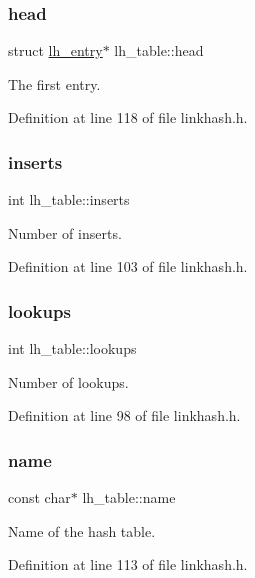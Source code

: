 \subsubsection{\texorpdfstring{head}{head}}
{\footnotesize\ttfamily struct \hyperlink{structlh__entry}{lh\+\_\+entry}$\ast$ lh\+\_\+table\+::head}

The first entry. 

Definition at line 118 of file linkhash.\+h.

\mbox{\label{structlh__table_afd64becd0d2cfbc91a4c9c9a117498b9}} 
\subsubsection{\texorpdfstring{inserts}{inserts}}
{\footnotesize\ttfamily int lh\+\_\+table\+::inserts}

Number of inserts. 

Definition at line 103 of file linkhash.\+h.

\mbox{\label{structlh__table_afd0385c645413d26e682f725a6f52164}} 
\subsubsection{\texorpdfstring{lookups}{lookups}}
{\footnotesize\ttfamily int lh\+\_\+table\+::lookups}

Number of lookups. 

Definition at line 98 of file linkhash.\+h.

\mbox{\label{structlh__table_aebf4001cde3746ec8025c1d87d4e6279}} 
\subsubsection{\texorpdfstring{name}{name}}
{\footnotesize\ttfamily const char$\ast$ lh\+\_\+table\+::name}

Name of the hash table. 

Definition at line 113 of file linkhash.\+h.

\mbox{\label{structlh__table_ab4cde49bd9ce7a07daaf99af34ddb67e}} 
